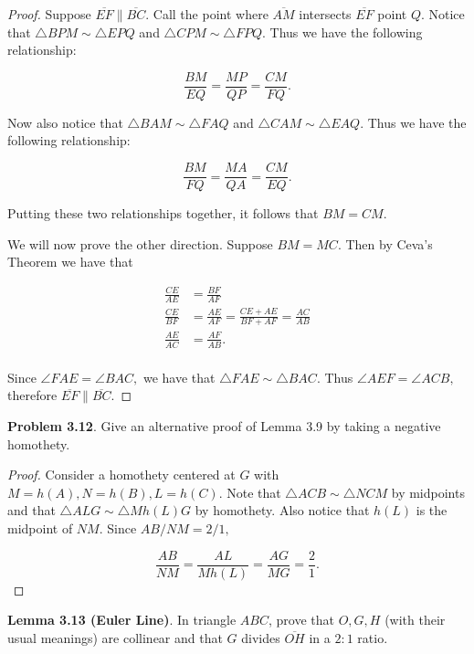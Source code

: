 \documentclass[letterpaper,oneside]{book}
\begin{document}
 \begin{proof}
  Suppose $\overline{EF} \parallel \overline{BC}.$ Call the point where $\overline{AM}$ intersects $\overline{EF}$ point $Q.$ Notice that $\triangle BPM \sim \triangle EPQ$ and $\triangle CPM \sim \triangle FPQ.$ Thus we have the following relationship:

$$\frac{BM}{EQ} = \frac{MP}{QP} = \frac{CM}{FQ}.$$

Now also notice that $\triangle BAM \sim \triangle FAQ$ and $\triangle CAM \sim \triangle EAQ.$ Thus we have the following relationship:

$$\frac{BM}{FQ} = \frac{MA}{QA} = \frac{CM}{EQ}.$$

Putting these two relationships together, it follows that $BM=CM.$  

We will now prove the other direction. Suppose $BM=MC.$ Then by Ceva's Theorem we have that

\begin{align*} 
\frac{CE}{AE}&=\frac{BF}{AF}\\
\frac{CE}{BF}&=\frac{AE}{AF} = \frac{CE+AE}{BF+AF}=\frac{AC}{AB}\\
\frac{AE}{AC}&=\frac{AF}{AB}.\\
\end{align*}

Since $\angle FAE=\angle BAC,$ we have that $\triangle FAE \sim \triangle BAC.$ Thus $\angle AEF = \angle ACB,$ therefore $\overline{EF} \parallel \overline{BC}.$ \end{proof}



 \textbf{Problem 3.12}.   Give an alternative proof of Lemma 3.9 by taking a negative homothety.

\begin{proof}
  Consider a homothety centered at $G$ with $M=h(A), N=h(B), L = h(C).$ Note that $\triangle ACB \sim \triangle NCM$ by midpoints and that $\triangle {ALG} \sim \triangle {Mh(L)G}$ by homothety. Also notice that $h(L)$ is the midpoint of $NM.$ Since ${AB}/{NM} = 2/1,$

$$\frac{AB}{NM} = \frac{AL}{Mh(L)} = \frac{AG}{MG} = \frac21.$$
\end{proof}



  \textbf{Lemma 3.13 (Euler Line)}.   In triangle $ABC$, prove that $O, G, H$ (with their usual meanings) are collinear and that $G$ divides $\overline{OH}$ in a $2:1$ ratio.
\end{document}
